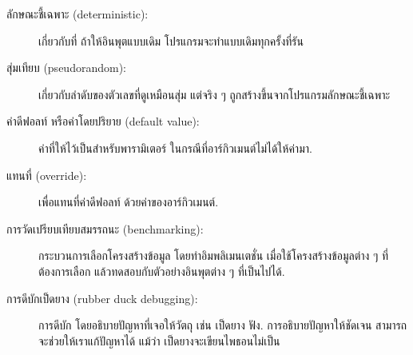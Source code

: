 \begin{description}


\item[ลักษณะชี้เฉพาะ (deterministic):]
เกี่ยวกับที่ ถ้าให้อินพุตแบบเดิม โปรแกรมจะทำแบบเดิมทุกครั้งที่รัน


\item[สุ่มเทียบ (pseudorandom):]
เกี่ยวกับลำดับของตัวเลขที่ดูเหมือนสุ่ม
แต่จริง ๆ ถูกสร้างขึ้นจากโปรแกรมลักษณะชี้เฉพาะ


\item[ค่าดีฟอลท์ หรือค่าโดยปริยาย (default value):]
ค่าที่ให้ไว้เป็นสำหรับพารามิเตอร์ ในกรณีที่อาร์กิวเมนต์ไม่ได้ให้ค่ามา.


\item[แทนที่ (override):] 
เพื่อแทนที่ค่าดีฟอลท์ ด้วยค่าของอาร์กิวเมนต์.



\item[การวัดเปรียบเทียบสมรรถนะ (benchmarking):] 
กระบวนการเลือกโครงสร้างข้อมูล
โดยทำอิมพลิเมนเตชั่น เมื่อใช้โครงสร้างข้อมูลต่าง ๆ ที่ต้องการเลือก
แล้วทดสอบกับตัวอย่างอินพุตต่าง ๆ ที่เป็นไปได้.



\item[การดีบักเป็ดยาง (rubber duck debugging):] 
การดีบัก โดยอธิบายปัญหาที่เจอให้วัตถุ เช่น เป็ดยาง ฟัง.
การอธิบายปัญหาให้ชัดเจน สามารถจะช่วยให้เราแก้ปัญหาได้ แม้ว่า เป็ดยางจะเขียนไพธอนไม่เป็น


\end{description}


